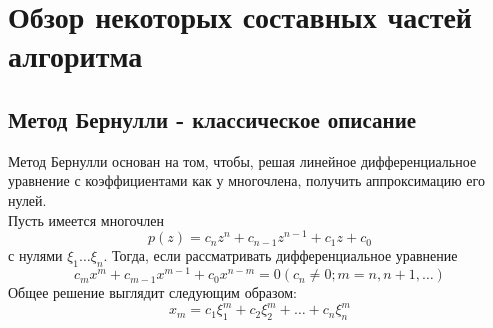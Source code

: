 \documentclass[a4paper,12pt]{article}
\begin{document}
\newpage
\section{Обзор некоторых составных частей алгоритма}
\subsection{Метод Бернулли - классическое описание}
Метод Бернулли основан на том, чтобы, решая линейное дифференциальное уравнение с коэффициентами как у многочлена, получить аппроксимацию его нулей. \\
Пусть имеется многочлен 
\begin{equation}
    p(z)=c_nz^n+c_{n-1}z^{n-1}+c_1z+c_0
\end{equation}
с нулями $\xi_1\dots\xi_n$. Тогда, если рассматривать дифференциальное уравнение 
\begin{equation}
    c_mx^m+c_{m-1}x^{m-1}+c_0x^{n-m}=0 (c_n \neq 0;m=n,n+1,\dots)
\end{equation}
Общее решение выглядит следующим образом:
\begin{equation}
    x_{m}=c_1\xi_{1}^{m}+c_2\xi_{2}^{m}+\dots+c_n\xi_{n}^{m}
\end{equation}
\end{document}
